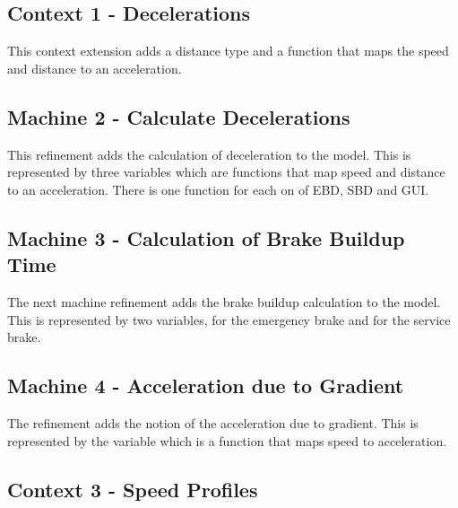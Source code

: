 \documentclass{template/openetcs_article}
\begin{document}
{\footnotesize

}

\subsection{Context 1 - Decelerations}
\label{sec:cont-1-decel}

This context extension adds a distance type and a function that maps the speed
and distance to an acceleration.

{\footnotesize

}

\subsection{Machine 2 - Calculate Decelerations}
\label{sec:machine-2-calculate}

This refinement adds the calculation of deceleration to the model. This is
represented by three variables which are functions that map speed and distance
to an acceleration. There is one function for each on of EBD, SBD and GUI.

{\footnotesize

}

\subsection{Machine 3 - Calculation of Brake Buildup Time}
\label{sec:mach-3-calc}

The next machine refinement adds the brake buildup calculation to the
model. This is represented by two variables,  for the emergency
brake and  for the service brake.

{\footnotesize

}

\subsection{Machine 4 - Acceleration due to Gradient}
\label{sec:mach-4-accel}

The refinement adds the notion of the acceleration due to gradient. This is
represented by the variable  which is a function that maps
speed to acceleration.

{\footnotesize

}

\subsection{Context 3 - Speed Profiles}
\label{sec:context-3-speed}
\end{document}
